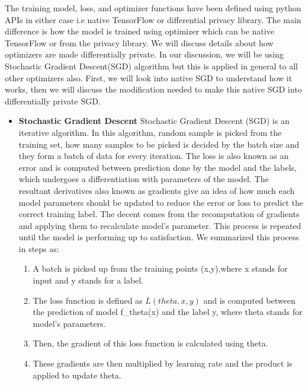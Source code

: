 The training model, loss, and optimizer functions have been defined using python APIs in either case i.e native TensorFlow or differential privacy library. The main difference is how the model is trained using optimizer which can be native TensorFlow or from the privacy library. We will discuss details about how optimizers are made differentially private. In our discussion, we will be using Stochastic Gradient Descent(SGD) algorithm but this is applied in general to all other optimizers also. First, we will look into native SGD to understand how it works, then we will discuss the modification needed to make this native SGD into differentially private SGD.
\begin{itemize}
\item \textbf{Stochastic Gradient Descent}
Stochastic Gradient Descent (SGD) is an iterative algorithm. In this algorithm, random sample is picked from the training set, how many samples to be picked is decided by the batch size and they form a batch of data for every iteration. The loss is also known as an error and is computed between prediction done by the model and the labels, which undergoes a differentiation with parameters of the model. The resultant derivatives also known as gradients give an idea of how much each model parameters should be updated to reduce the error or loss to predict the correct training label. The decent comes from the recomputation of gradients and applying them to recalculate model's parameter. This process is repeated until the model is performing up to satisfaction. We summarized this process in steps as:
\begin{enumerate}
\item{A batch is picked up from the training points (x,y),where x stands for input and y stands for a label.}
\vspace{-0.3cm}\item{The loss function is defined as $L(theta, x, y)$ and is computed between the prediction of model f\_theta(x) and the label y, where theta stands for model's parameters.}
\vspace{-0.3cm}\item{Then, the gradient of this loss function is calculated using theta.}
\vspace{-0.3cm}\item{These gradients are then multiplied by learning rate and the product is applied to update theta.}
\end{enumerate}


\end{itemize}
